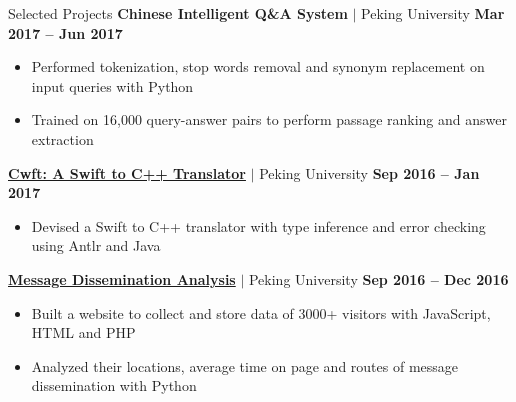 \begin{MySection}{Selected Projects}
    \textbf{Chinese Intelligent Q\&A System}
    $|$ Peking University\hfill%
    \textbf{Mar 2017 -- Jun 2017}
    \begin{itemize}
        \item Performed tokenization,
        stop words removal
        and synonym replacement on input queries
        with Python
        \item Trained on 16,000 query-answer pairs to perform
        passage ranking and answer extraction
    \end{itemize}
    \href{https://github.com/gaosa/cwft}{\textbf{Cwft: A Swift to C++ Translator}}
    $|$ Peking University\hfill%
    \textbf{Sep 2016 -- Jan 2017}
    \begin{itemize}
        \item Devised a Swift to C++ translator 
        with type inference and error checking
        using Antlr and Java
    \end{itemize}
    \href{https://github.com/gaosa/Wechat-Message-Dissemination-Analysis}{\textbf{Message Dissemination Analysis}}
    $|$ Peking University\hfill%
    \textbf{Sep 2016 -- Dec 2016}
    \begin{itemize}
        \item Built a website to
        collect and store data of 
        3000+ visitors with JavaScript, HTML and PHP
        \item Analyzed their locations, average time on page
        and routes of message dissemination with Python
    \end{itemize}

    \vspace{-0.15in}

\end{MySection}